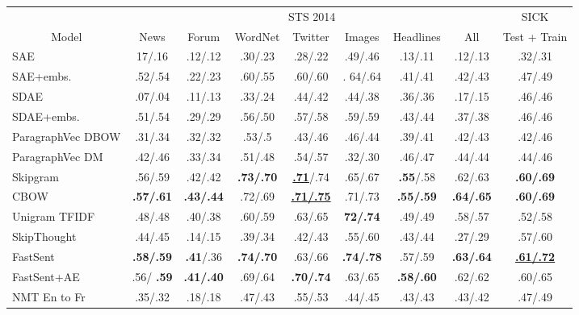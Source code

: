 \begin{table*}[ht]
\begin{adjustwidth}{-1cm}{}
\begin{center}
      {
        \begin{tabular}{l|cccccc|c|c}
          & \multicolumn{7}{c|}{STS 2014} & SICK \\
           \multicolumn{1}{c|}{Model} & News & Forum & WordNet & Twitter & Images & Headlines & All  & \multicolumn{1}{c}{Test + Train}  \\
          \hline
\hline
    SAE & 17/.16 & .12/.12 & 	.30/.23 & 	.28/.22 & 	.49/.46 & 	.13/.11 & 	.12/.13 & .32/.31 \\
          SAE+embs. & .52/.54 & .22/.23 &  .60/.55 &  .60/.60 & . 64/.64 & .41/.41 & .42/.43 & .47/.49\\
 SDAE & .07/.04 &  .11/.13& .33/.24 & .44/.42 & .44/.38 & .36/.36 & .17/.15 & .46/.46 \\
 SDAE+embs.  & .51/.54 & .29/.29	& .56/.50	& .57/.58	& .59/.59	& .43/.44	& .37/.38 & .46/.46 \\
          ParagraphVec DBOW & .31/.34 & .32/.32 & .53/.5 & .43/.46 & .46/.44 & .39/.41 & .42/.43 & .42/.46\\
          ParagraphVec DM & .42/.46 & .33/.34 & .51/.48 & .54/.57 & .32/.30 &  .46/.47 &  .44/.44 & .44/.46 \\
                  Skipgram &.56/.59&	.42/.42& \bf	.73/.70& \underline{\bf .71}/.74&	.65/.67& {\bf	.55}/.58&	.62/.63 & \bf .60/.69 \\
          CBOW & \bf .57/.61 & \bf	.43/.44	& .72/.69	&\underline{\bf .71/.75}&.71/.73& \bf	.55/.59&	\bf .64/.65 & \bf .60/.69 \\
Unigram TFIDF & .48/.48 & .40/.38 & .60/.59  & .63/.65 & \bf 72/.74 &.49/.49	&.58/.57 & .52/.58 \\
          \hline 
           SkipThought & .44/.45 & .14/.15 & .39/.34 & .42/.43 & .55/.60 & .43/.44 & .27/.29 & .57/.60\\
FastSent &  {\bf .58/.59} & {\bf .41}/.36 & \bf .74/.70 & .63/.66 &  \bf{.74/.78} & .57/.59 &  \bf .63/.64 & \underline{\bf .61/.72}\\
FastSent+AE & .56/ \bf{.59} & \bf{.41/.40} &  .69/.64 & \bf .70/.74 & .63/.65 &  \bf{.58/.60} &  .62/.62 & .60/.65 \\
          \hline 
          NMT En to Fr & .35/.32	& .18/.18	& .47/.43 & .55/.53	& .44/.45	& .43/.43 & .43/.42 & .47/.49 \\



\end{tabular}}
\end{center}
\end{adjustwidth}
\end{table*}
